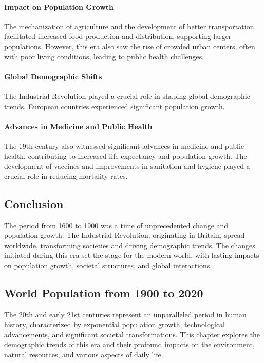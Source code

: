 \documentclass[a4paper,12pt]{book}
\begin{document}
\paragraph{Impact on Population Growth}
The mechanization of agriculture and the development of better transportation facilitated increased food production and distribution, supporting larger populations. However, this era also saw the rise of crowded urban centers, often with poor living conditions, leading to public health challenges.

\paragraph{Global Demographic Shifts}
The Industrial Revolution played a crucial role in shaping global demographic trends. European countries experienced significant population growth.

\paragraph{Advances in Medicine and Public Health}
The 19th century also witnessed significant advances in medicine and public health, contributing to increased life expectancy and population growth. The development of vaccines and improvements in sanitation and hygiene played a crucial role in reducing mortality rates.

\subsection*{Conclusion}
The period from 1600 to 1900 was a time of unprecedented change and population growth. The Industrial Revolution, originating in Britain, spread worldwide, transforming societies and driving demographic trends. The changes initiated during this era set the stage for the modern world, with lasting impacts on population growth, societal structures, and global interactions.

\subsection*{World Population from 1900 to 2020}
The 20th and early 21st centuries represent an unparalleled period in human history, characterized by exponential population growth, technological advancements, and significant societal transformations. This chapter explores the demographic trends of this era and their profound impacts on the environment, natural resources, and various aspects of daily life.
\end{document}

